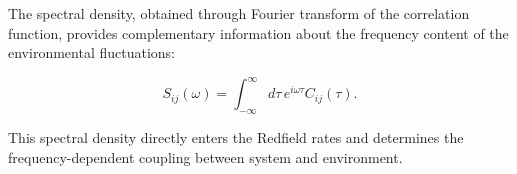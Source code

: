 The spectral density, obtained through Fourier transform of the correlation function, provides complementary information about the frequency content of the environmental fluctuations:

\begin{equation}
	S_{ij}(\omega) = \int_{-\infty}^{\infty} d\tau \, e^{i\omega\tau} C_{ij}(\tau).
	\label{eq:spectral_density}
\end{equation}

This spectral density directly enters the Redfield rates and determines the frequency-dependent coupling between system and environment.
